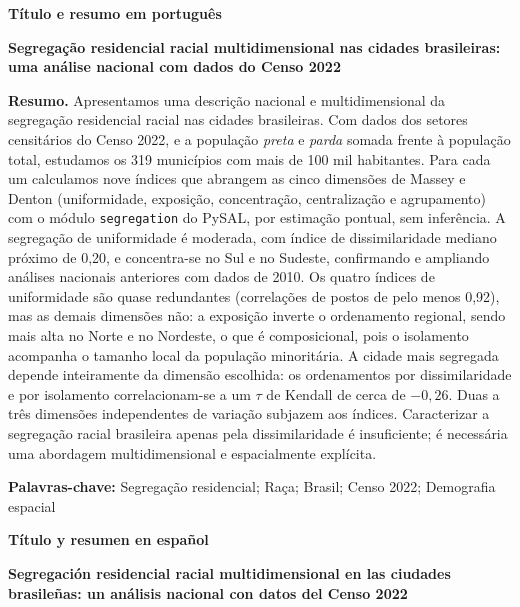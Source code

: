 \documentclass[12pt,a4paper]{article}
\begin{document}
\vspace{1.5em}
\begin{center}\textbf{\large T\'itulo e resumo em portugu\^es}\end{center}

\noindent\textbf{Segrega\c{c}\~ao residencial racial multidimensional nas cidades
brasileiras: uma an\'alise nacional com dados do Censo 2022}

\medskip
\noindent\textbf{Resumo.} Apresentamos uma descri\c{c}\~ao nacional e
multidimensional da segrega\c{c}\~ao residencial racial nas cidades brasileiras.
Com dados dos setores censit\'arios do Censo 2022, e a popula\c{c}\~ao
\emph{preta} e \emph{parda} somada frente \`a popula\c{c}\~ao total, estudamos os
319 munic\'ipios com mais de 100 mil habitantes. Para cada um calculamos nove
\'indices que abrangem as cinco dimens\~oes de Massey e Denton (uniformidade,
exposi\c{c}\~ao, concentra\c{c}\~ao, centraliza\c{c}\~ao e agrupamento) com o
m\'odulo \texttt{segregation} do PySAL, por estima\c{c}\~ao pontual, sem
infer\^encia. A segrega\c{c}\~ao de uniformidade \'e moderada, com \'indice de
dissimilaridade mediano pr\'oximo de 0,20, e concentra-se no Sul e no Sudeste,
confirmando e ampliando an\'alises nacionais anteriores com dados de 2010. Os
quatro \'indices de uniformidade s\~ao quase redundantes (correla\c{c}\~oes de
postos de pelo menos 0,92), mas as demais dimens\~oes n\~ao: a exposi\c{c}\~ao
inverte o ordenamento regional, sendo mais alta no Norte e no Nordeste, o que
\'e composicional, pois o isolamento acompanha o tamanho local da popula\c{c}\~ao
minorit\'aria. A cidade mais segregada depende inteiramente da dimens\~ao
escolhida: os ordenamentos por dissimilaridade e por isolamento correlacionam-se
a um $\tau$ de Kendall de cerca de $-0{,}26$. Duas a tr\^es dimens\~oes
independentes de varia\c{c}\~ao subjazem aos \'indices. Caracterizar a
segrega\c{c}\~ao racial brasileira apenas pela dissimilaridade \'e insuficiente;
\'e necess\'aria uma abordagem multidimensional e espacialmente expl\'icita.

\medskip
\noindent\textbf{Palavras-chave:} Segrega\c{c}\~ao residencial; Ra\c{c}a; Brasil;
Censo 2022; Demografia espacial

\vspace{1.5em}
\begin{center}\textbf{\large T\'itulo y resumen en espa\~nol}\end{center}

\noindent\textbf{Segregaci\'on residencial racial multidimensional en las ciudades
brasile\~nas: un an\'alisis nacional con datos del Censo 2022}
\end{document}
